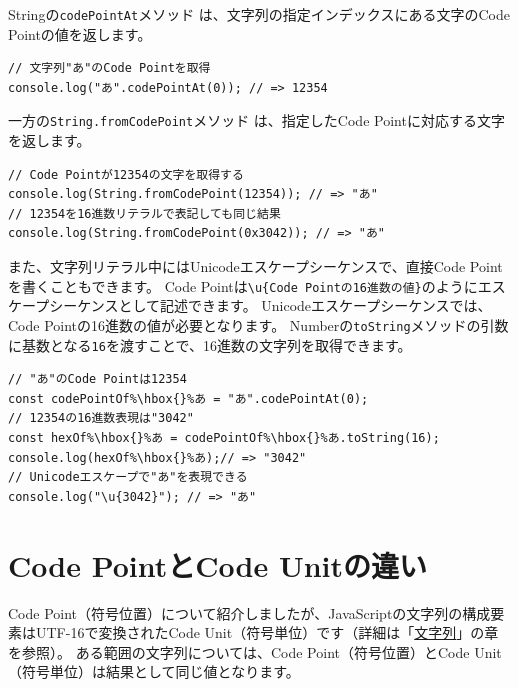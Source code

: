 Stringの\texttt{codePointAt}メソッド\,\protect{}\,は、文字列の指定インデックスにある文字のCode
Pointの値を返します。

\begin{lstlisting}
// 文字列"あ"のCode Pointを取得
console.log("あ".codePointAt(0)); // => 12354
\end{lstlisting}

一方の\texttt{String.fromCodePoint}メソッド\,\protect{}\,は、指定したCode
Pointに対応する文字を返します。

\begin{lstlisting}
// Code Pointが12354の文字を取得する
console.log(String.fromCodePoint(12354)); // => "あ"
// 12354を16進数リテラルで表記しても同じ結果
console.log(String.fromCodePoint(0x3042)); // => "あ"
\end{lstlisting}

また、文字列リテラル中にはUnicodeエスケープシーケンスで、直接Code
Pointを書くこともできます。 Code
Pointは\texttt{\textbackslash u\{Code Pointの16進数の値\}}のようにエスケープシーケンスとして記述できます。
Unicodeエスケープシーケンスでは、Code
Pointの16進数の値が必要となります。
Numberの\texttt{toString}メソッドの引数に基数となる\texttt{16}を渡すことで、16進数の文字列を取得できます。

\begin{lstlisting}[escapechar=\%]
// "あ"のCode Pointは12354
const codePointOf%\hbox{}%あ = "あ".codePointAt(0);
// 12354の16進数表現は"3042"
const hexOf%\hbox{}%あ = codePointOf%\hbox{}%あ.toString(16);
console.log(hexOf%\hbox{}%あ);// => "3042"
// Unicodeエスケープで"あ"を表現できる
console.log("\u{3042}"); // => "あ"
\end{lstlisting}

\hypertarget{code-point-is-not-code-unit}{%
\section{Code PointとCode
Unitの違い}\label{code-point-is-not-code-unit}}

Code
Point（符号位置）について紹介しましたが、JavaScriptの文字列の構成要素はUTF-16で変換されたCode
Unit（符号単位）です（詳細は「\hyperlink{string}{文字列}」の章を参照）。
ある範囲の文字列については、Code Point（符号位置）とCode
Unit（符号単位）は結果として同じ値となります。

